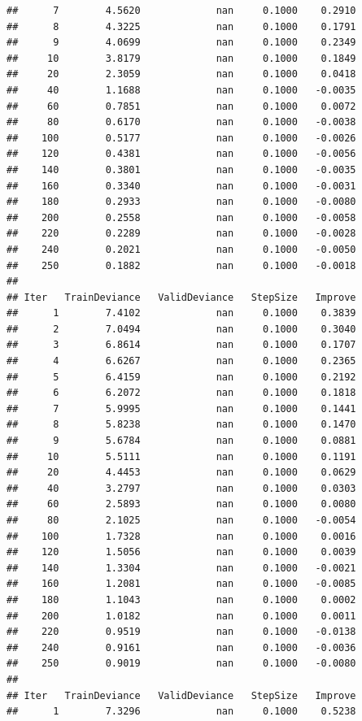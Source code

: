 \documentclass[
]{book}
\begin{document}
\begin{verbatim}
##      7        4.5620             nan     0.1000    0.2910
##      8        4.3225             nan     0.1000    0.1791
##      9        4.0699             nan     0.1000    0.2349
##     10        3.8179             nan     0.1000    0.1849
##     20        2.3059             nan     0.1000    0.0418
##     40        1.1688             nan     0.1000   -0.0035
##     60        0.7851             nan     0.1000    0.0072
##     80        0.6170             nan     0.1000   -0.0038
##    100        0.5177             nan     0.1000   -0.0026
##    120        0.4381             nan     0.1000   -0.0056
##    140        0.3801             nan     0.1000   -0.0035
##    160        0.3340             nan     0.1000   -0.0031
##    180        0.2933             nan     0.1000   -0.0080
##    200        0.2558             nan     0.1000   -0.0058
##    220        0.2289             nan     0.1000   -0.0028
##    240        0.2021             nan     0.1000   -0.0050
##    250        0.1882             nan     0.1000   -0.0018
## 
## Iter   TrainDeviance   ValidDeviance   StepSize   Improve
##      1        7.4102             nan     0.1000    0.3839
##      2        7.0494             nan     0.1000    0.3040
##      3        6.8614             nan     0.1000    0.1707
##      4        6.6267             nan     0.1000    0.2365
##      5        6.4159             nan     0.1000    0.2192
##      6        6.2072             nan     0.1000    0.1818
##      7        5.9995             nan     0.1000    0.1441
##      8        5.8238             nan     0.1000    0.1470
##      9        5.6784             nan     0.1000    0.0881
##     10        5.5111             nan     0.1000    0.1191
##     20        4.4453             nan     0.1000    0.0629
##     40        3.2797             nan     0.1000    0.0303
##     60        2.5893             nan     0.1000    0.0080
##     80        2.1025             nan     0.1000   -0.0054
##    100        1.7328             nan     0.1000    0.0016
##    120        1.5056             nan     0.1000    0.0039
##    140        1.3304             nan     0.1000   -0.0021
##    160        1.2081             nan     0.1000   -0.0085
##    180        1.1043             nan     0.1000    0.0002
##    200        1.0182             nan     0.1000    0.0011
##    220        0.9519             nan     0.1000   -0.0138
##    240        0.9161             nan     0.1000   -0.0036
##    250        0.9019             nan     0.1000   -0.0080
## 
## Iter   TrainDeviance   ValidDeviance   StepSize   Improve
##      1        7.3296             nan     0.1000    0.5238

\end{verbatim}
\end{document}
